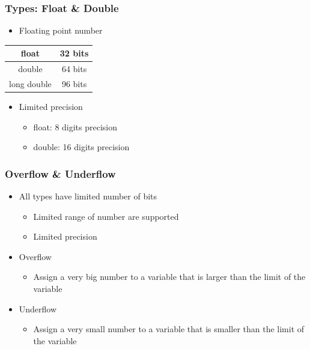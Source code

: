 \documentclass{../c-lecture}
\begin{document}
\begin{frame}
  \frametitle{Types: Float \& Double}
  \begin{itemize}
    \item Floating point number
  \end{itemize}
  \begin{table}
  \begin{tabular}{cc}
    \toprule

    float &
    32 bits \\

    \midrule

    double &
    64 bits \\

    \midrule

    long double &
    96 bits \\

    \bottomrule
  \end{tabular}
  \end{table}
  \begin{itemize}
    \item Limited precision
    \begin{itemize}
      \item float: 8 digits precision
      \item double: 16 digits precision
    \end{itemize}
  \end{itemize}
\end{frame}

\begin{frame}
  \frametitle{Overflow \& Underflow}
  \begin{itemize}
    \item All types have limited number of bits
    \begin{itemize}
      \item Limited range of number are supported
      \item Limited precision
    \end{itemize}
    \item Overflow
    \begin{itemize}
      \item Assign a very big number to a variable that is larger than the limit of
        the variable
    \end{itemize}
    \item Underflow
    \begin{itemize}
      \item Assign a very small number to a variable that is smaller than the limit
        of the variable
    \end{itemize}
  \end{itemize}
\end{frame}
\end{document}
